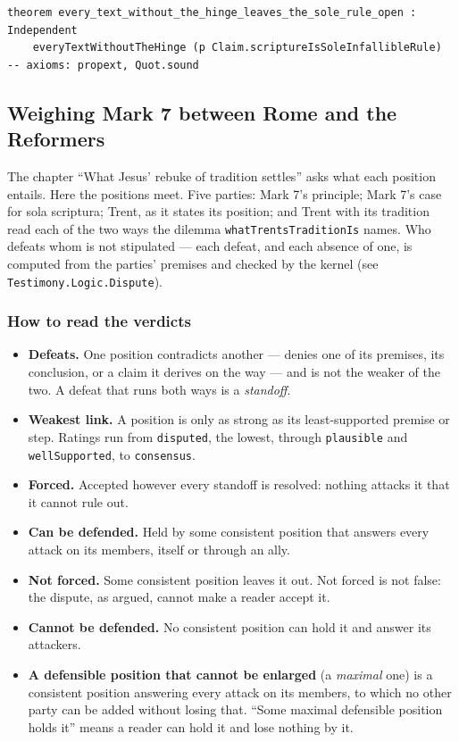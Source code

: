 \documentclass[11pt]{article}
\begin{document}
{\small\begin{verbatim}
theorem every_text_without_the_hinge_leaves_the_sole_rule_open : Independent
    everyTextWithoutTheHinge (p Claim.scriptureIsSoleInfallibleRule)
-- axioms: propext, Quot.sound
\end{verbatim}}
\subsection*{Weighing Mark 7 between Rome and the Reformers}
The chapter “What Jesus’ rebuke of tradition settles” asks what each position entails. Here the positions meet. Five parties: Mark 7’s principle; Mark 7’s case for sola scriptura; Trent, as it states its position; and Trent with its tradition read each of the two ways the dilemma \texttt{what\allowbreak{}Trents\allowbreak{}Tradition\allowbreak{}Is} names. Who defeats whom is not stipulated — each defeat, and each absence of one, is computed from the parties’ premises and checked by the kernel (see \texttt{Testimony.Logic.Dispute}).

\subsubsection*{How to read the verdicts}
\begin{itemize}
  \item \textbf{Defeats.} One position contradicts another — denies one of its premises, its conclusion, or a claim it derives on the way — and is not the weaker of the two. A defeat that runs both ways is a \emph{standoff}.
  \item \textbf{Weakest link.} A position is only as strong as its least-supported premise or step. Ratings run from \texttt{disputed}, the lowest, through \texttt{plausible} and \texttt{well\allowbreak{}Supported}, to \texttt{consensus}.
  \item \textbf{Forced.} Accepted however every standoff is resolved: nothing attacks it that it cannot rule out.
  \item \textbf{Can be defended.} Held by some consistent position that answers every attack on its members, itself or through an ally.
  \item \textbf{Not forced.} Some consistent position leaves it out. Not forced is not false: the dispute, as argued, cannot make a reader accept it.
  \item \textbf{Cannot be defended.} No consistent position can hold it and answer its attackers.
  \item \textbf{A defensible position that cannot be enlarged} (a \emph{maximal} one) is a consistent position answering every attack on its members, to which no other party can be added without losing that. “Some maximal defensible position holds it” means a reader can hold it and lose nothing by it.
\end{itemize}
\end{document}
